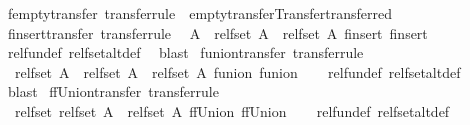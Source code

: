 \begin{isabellebody}
\ fempty{\isacharunderscore}transfer\ {\isacharbrackleft}transfer{\isacharunderscore}rule{\isacharbrackright}\ {\isacharequal}\ empty{\isacharunderscore}transfer{\isacharbrackleft}Transfer{\isachardot}transferred{\isacharbrackright}\isanewline
\isanewline
{}\isamarkupfalse%
\ finsert{\isacharunderscore}transfer\ {\isacharbrackleft}transfer{\isacharunderscore}rule{\isacharbrackright}{\isacharcolon}\isanewline
\ \ {\isachardoublequoteopen}{\isacharparenleft}A\ {\isacharequal}{\isacharequal}{\isacharequal}{\isachargreater}\ rel{\isacharunderscore}fset\ A\ {\isacharequal}{\isacharequal}{\isacharequal}{\isachargreater}\ rel{\isacharunderscore}fset\ A{\isacharparenright}\ finsert\ finsert{\isachardoublequoteclose}\isanewline
%
\isadelimproof
\ \ %
\endisadelimproof
%
\isatagproof
{}\isamarkupfalse%
\ rel{\isacharunderscore}fun{\isacharunderscore}def\ rel{\isacharunderscore}fset{\isacharunderscore}alt{\isacharunderscore}def\ \isamarkupfalse%
\ blast%
\endisatagproof
{\isafoldproof}%
%
\isadelimproof
\isanewline
%
\endisadelimproof
\isanewline
{}\isamarkupfalse%
\ funion{\isacharunderscore}transfer\ {\isacharbrackleft}transfer{\isacharunderscore}rule{\isacharbrackright}{\isacharcolon}\isanewline
\ \ {\isachardoublequoteopen}{\isacharparenleft}rel{\isacharunderscore}fset\ A\ {\isacharequal}{\isacharequal}{\isacharequal}{\isachargreater}\ rel{\isacharunderscore}fset\ A\ {\isacharequal}{\isacharequal}{\isacharequal}{\isachargreater}\ rel{\isacharunderscore}fset\ A{\isacharparenright}\ funion\ funion{\isachardoublequoteclose}\isanewline
%
\isadelimproof
\ \ %
\endisadelimproof
%
\isatagproof
{}\isamarkupfalse%
\ rel{\isacharunderscore}fun{\isacharunderscore}def\ rel{\isacharunderscore}fset{\isacharunderscore}alt{\isacharunderscore}def\ \isamarkupfalse%
\ blast%
\endisatagproof
{\isafoldproof}%
%
\isadelimproof
\isanewline
%
\endisadelimproof
\isanewline
{}\isamarkupfalse%
\ ffUnion{\isacharunderscore}transfer\ {\isacharbrackleft}transfer{\isacharunderscore}rule{\isacharbrackright}{\isacharcolon}\isanewline
\ \ {\isachardoublequoteopen}{\isacharparenleft}rel{\isacharunderscore}fset\ {\isacharparenleft}rel{\isacharunderscore}fset\ A{\isacharparenright}\ {\isacharequal}{\isacharequal}{\isacharequal}{\isachargreater}\ rel{\isacharunderscore}fset\ A{\isacharparenright}\ ffUnion\ ffUnion{\isachardoublequoteclose}\isanewline
%
\isadelimproof
\ \ %
\endisadelimproof
%
\isatagproof
{}\isamarkupfalse%
\ rel{\isacharunderscore}fun{\isacharunderscore}def\ rel{\isacharunderscore}fset{\isacharunderscore}alt{\isacharunderscore}def\ \isamarkupfalse%

\end{isabellebody}
